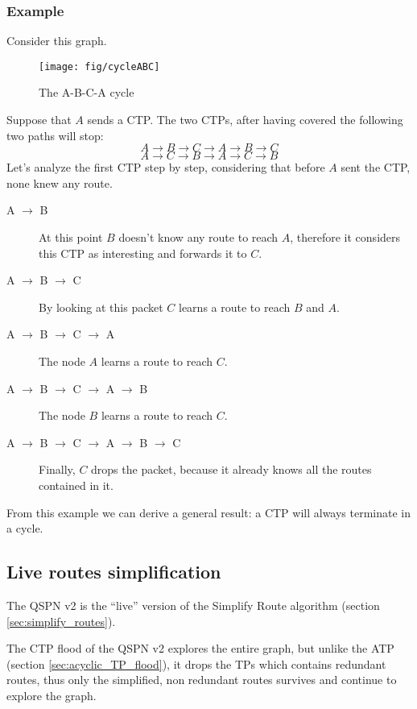 \documentclass[a4paper]{article}
\begin{document}
\subsubsection*{Example}
\label{sec:cycle_qv2_example}

Consider this graph.
\begin{figure}[h]
	\begin{center}
		\texttt{[image: fig/cycleABC]}
	\end{center}
	\caption{The A-B-C-A cycle}
	\label{fig:A-B-C-A}
\end{figure}
Suppose that $A$ sends a CTP. 
The two CTPs, after having covered the following two paths will stop:
\[
A \rightarrow B \rightarrow C \rightarrow A \rightarrow B \rightarrow C
\]
\[
A \rightarrow C \rightarrow B\rightarrow A \rightarrow C \rightarrow B
\]
Let's analyze the first CTP step by step, considering that before $A$ sent the
CTP, none knew any route.
\begin{description}
	\item[A $\rightarrow$ B] At this point $B$ doesn't know any route to
		reach $A$, therefore it considers this CTP as interesting and
		forwards it to $C$.
	\item[A $\rightarrow$ B $\rightarrow$ C] By looking at this packet $C$
		learns a route to reach $B$ and $A$.
	\item[A $\rightarrow$ B $\rightarrow$ C $\rightarrow$ A] The node $A$
		learns a route to reach $C$.
	\item[A $\rightarrow$ B $\rightarrow$ C $\rightarrow$ A $\rightarrow$
		B] The node $B$ learns a route to reach $C$.
	\item[A $\rightarrow$ B $\rightarrow$ C $\rightarrow$ A $\rightarrow$
		B $\rightarrow$ C] Finally, $C$ drops the packet, because it
		already knows all the routes contained in it.
\end{description}

From this example we can derive a general result: a CTP will always terminate
in a cycle.

\subsection{Live routes simplification}
The QSPN v2 is the ``live'' version of the Simplify Route algorithm (section
\ref{sec:simplify_routes}).

The CTP flood of the QSPN v2 explores the entire graph, but unlike the ATP
(section \ref{sec:acyclic_TP_flood}), it drops the TPs which contains
redundant routes, thus only the simplified, non redundant routes survives and
continue to explore the graph.
\end{document}

